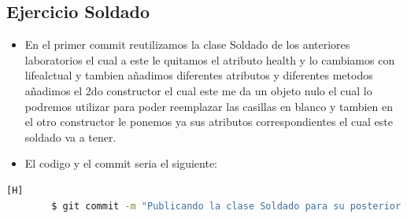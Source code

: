 \documentclass{article}
\begin{document}
	\subsection{Ejercicio Soldado}
	\begin{itemize}	
		\item En el primer commit reutilizamos la clase Soldado de los anteriores laboratorios el cual a este le quitamos el atributo health y lo cambiamos con lifealctual y tambien añadimos diferentes atributos y diferentes metodos añadimos el 2do constructor el cual este me da un objeto nulo el cual lo podremos utilizar para poder reemplazar las casillas en blanco y tambien en el otro constructor le ponemos ya sus atributos correspondientes el cual este soldado va a tener.
		\item El codigo y el commit seria el siguiente:
	\end{itemize}	
	\begin{lstlisting}[language=bash,caption={Commit}][H]
		$ git commit -m "Publicando la clase Soldado para su posterior uso en el siguiente ejercicio que es con Hashmaps"
	\end{lstlisting}	
\end{document}
